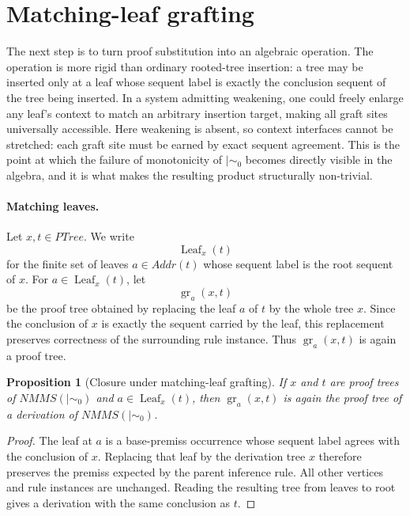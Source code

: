 \documentclass[11pt]{article}
\newtheorem{proposition}[theorem]{Proposition}
\newcommand{\mszero}{\mathrel{\mid\!\sim_{0}}}
\newcommand{\NMMS}{\mathit{NMMS}}
\newcommand{\PTree}{\mathit{PTree}}
\newcommand{\Addr}{\mathit{Addr}}
\begin{document}
\section{Matching-leaf grafting}

The next step is to turn proof substitution into an algebraic operation.  The
operation is more rigid than ordinary rooted-tree insertion: a
tree may be inserted only at a leaf whose sequent label is exactly the
conclusion sequent of the tree being inserted.  In a system admitting
weakening, one could freely enlarge any leaf's context to match an
arbitrary insertion target, making all graft sites universally accessible.
Here weakening is absent, so context interfaces cannot be stretched:
each graft site must be earned by exact sequent agreement.  This is the
point at which the failure of monotonicity of \(\mszero\) becomes
directly visible in the algebra, and it is what makes the resulting
product structurally non-trivial.

\paragraph{Matching leaves.}
Let \(x,t\in\PTree\).  We write
\[
\operatorname{Leaf}_x(t)
\]
for the finite set of leaves \(a\in\Addr(t)\) whose sequent label is the
root sequent of \(x\).  For \(a\in\operatorname{Leaf}_x(t)\), let
\[
\operatorname{gr}_a(x,t)
\]
be the proof tree obtained by replacing the leaf \(a\) of \(t\) by the whole
tree \(x\).  Since the conclusion of \(x\) is exactly the sequent carried by
the leaf, this replacement preserves correctness of the surrounding rule
instance.  Thus \(\operatorname{gr}_a(x,t)\) is again a proof tree.

\begin{proposition}[Closure under matching-leaf grafting]
If \(x\) and \(t\) are proof trees of \(\NMMS(\mszero)\) and
\(a\in\operatorname{Leaf}_x(t)\), then \(\operatorname{gr}_a(x,t)\) is again
the proof tree of a derivation of \(\NMMS(\mszero)\).
\end{proposition}

\begin{proof}
The leaf at \(a\) is a base-premiss occurrence whose sequent label agrees with
the conclusion of \(x\).  Replacing that leaf by the derivation tree \(x\)
therefore preserves the premiss expected by the parent inference rule.  All
other vertices and rule instances are unchanged.  Reading the resulting tree
from leaves to root gives a derivation with the same conclusion as \(t\).
\end{proof}
\end{document}
